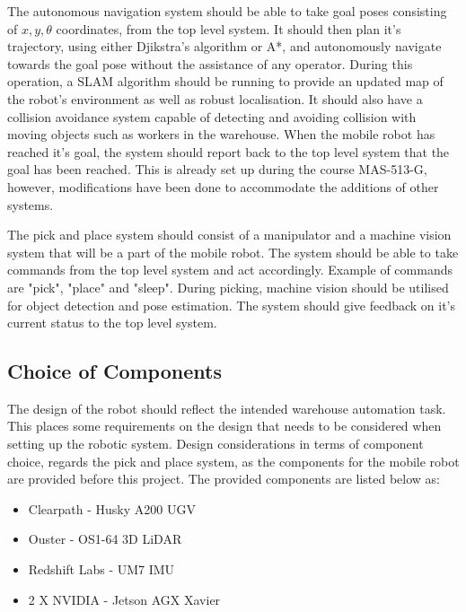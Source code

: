 The autonomous navigation system should be able to take goal poses consisting of $x,y,\theta$ coordinates, from the top level system. It should then plan it's trajectory, using either Djikstra's algorithm or A*, and autonomously navigate towards the goal pose without the assistance of any operator. During this operation, a SLAM algorithm should be running to provide an updated map of the robot's environment as well as robust localisation. It should also have a collision avoidance system capable of detecting and avoiding collision with moving objects such as workers in the warehouse. When the mobile robot has reached it's goal, the system should report back to the top level system that the goal has been reached. This is already set up during the course MAS-513-G, however, modifications have been done to accommodate the additions of other systems.

The pick and place system should consist of a manipulator and a machine vision system that will be a part of the mobile robot. The system should be able to take commands from the top level system and act accordingly. Example of commands are "pick", "place" and "sleep". During picking, machine vision should be utilised for object detection and pose estimation. The system should give feedback on it's current status to the top level system.

\subsection{Choice of Components} \label{sec:M:CD:ChoiceOfComponents}
The design of the robot should reflect the intended warehouse automation task. This places some requirements on the design that needs to be considered when setting up the robotic system. Design considerations in terms of component choice, regards the pick and place system, as the components for the mobile robot are provided before this project. The provided components are listed below as:

\begin{itemize}
    \item Clearpath - Husky A200 UGV
    \item Ouster - OS1-64 3D LiDAR
    \item Redshift Labs - UM7 IMU
    \item 2 X NVIDIA - Jetson AGX Xavier
\end{itemize}

